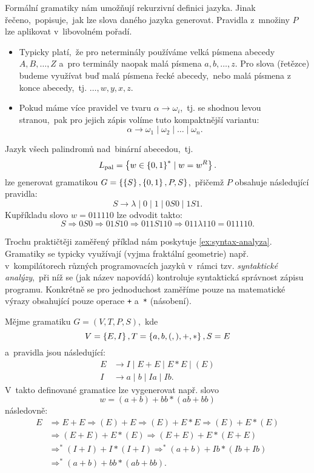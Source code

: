 Formální gramatiky nám umožňují rekurzivní definici jazyka. Jinak řečeno,~popisuje,~jak lze slova daného jazyka generovat. Pravidla z~množiny $P$ lze aplikovat v~libovolném pořadí.
\begin{remark}
    \begin{itemize}
        \item Typicky platí,~že pro neterminály používáme velká písmena abecedy $A,B,\ldots,Z$ a~pro terminály naopak malá písmena $a,b,\ldots,z$. Pro slova (řetězce) budeme využívat buď malá písmena řecké abecedy,~nebo malá písmena z konce abecedy,~tj. $\dots,w,y,x,z$.
        \item Pokud máme více pravidel ve tvaru $\alpha\to\omega_i$,~tj. se shodnou levou stranou,~pak pro jejich zápis volíme tuto kompaktnější variantu:
        \[\alpha\to\omega_1\mid\omega_2\mid\dots\mid\omega_n.\]
    \end{itemize}
\end{remark}
\begin{example}
    Jazyk všech palindromů nad~binární abecedou,~tj.
    \[L_\text{pal}=\left\{w\in\left\{0,1\right\}^*\mid w=w^R\right\}.\]
    lze generovat gramatikou $G=\left\{\left\{S\right\},\left\{0,1\right\},P,S\right\}$,~přičemž $P$ obsahuje následující pravidla:
    \[S\to\lambda\mid 0\mid 1\mid 0S0\mid 1S1.\]
    Kupříkladu slovo $w=011110$ lze odvodit takto:
    \[S\Rightarrow 0S0\Rightarrow 01S10\Rightarrow011S110\Rightarrow011\lambda 110=011110.\]
\end{example}
Trochu praktičtěji zaměřený příklad nám poskytuje \ref{ex:syntax-analyza}. Gramatiky se typicky využívají (vyjma fraktální geometrie) např. v~kompilátorech různých programovacích jazyků v~rámci tzv. \emph{syntaktické analýzy},~při níž se (jak název napovídá) kontroluje syntaktická správnost zápisu programu. Konkrétně se pro jednoduchost zaměříme pouze na matematické výrazy obsahující pouze operace \texttt{+} a~\texttt{*} (násobení).
\begin{example}\label{ex:syntax-analyza}
    Mějme gramatiku $G=(V,T,P,S)$,~kde
    \[V=\left\{E,I\right\},T=\left\{a,b,(,),+,*\right\},S=E\]
    a~pravidla jsou následující:
    \begin{align*}
        E&\to I\mid E+E\mid E*E\mid (E)\\
        I&\to a\mid b\mid Ia\mid Ib.
    \end{align*}
    V~takto definované gramatice lze vygenerovat např. slovo
    \[w=(a+b)+bb*(ab+bb)\]
    následovně:
    \begin{align*}
        E&\Rightarrow E+E\Rightarrow(E)+E\Rightarrow(E)+E*E\Rightarrow(E)+E*(E)\\
        &\Rightarrow(E+E)+E*(E)\Rightarrow(E+E)+E*(E+E)\\
        &\Rightarrow^*(I+I)+I*(I+I)\Rightarrow^*(a+b)+Ib*(Ib+Ib)\\
        &\Rightarrow^*(a+b)+bb*(ab+bb).
    \end{align*}
\end{example}
